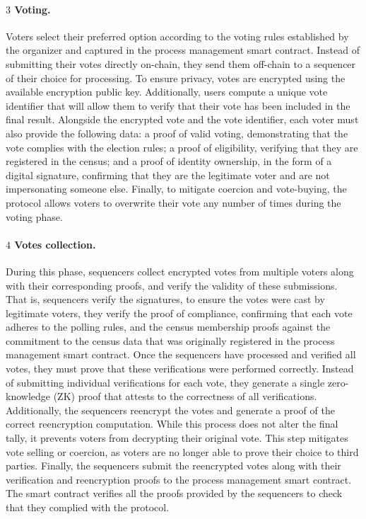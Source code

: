 \paragraph{$\boxed{3}$ Voting.}

Voters select their preferred option according to the voting rules established by the organizer and captured in the process management smart contract. Instead of submitting their votes directly on-chain, they send them off-chain to a sequencer of their choice for processing. To ensure privacy, votes are encrypted using the available encryption public key. 
Additionally, users compute a unique vote identifier that will allow them to verify that their vote has been included in the final result. Alongside the encrypted vote and the vote identifier, each voter must also provide the following data: a proof of valid voting, demonstrating that the vote complies with the election rules; a proof of eligibility, verifying that they are registered in the census; and a proof of identity ownership, in the form of a digital signature, confirming that they are the legitimate voter and are not impersonating someone else. Finally, to mitigate coercion and vote-buying, the protocol allows voters to overwrite their vote any number of times during the voting phase. 

\paragraph{$\boxed{4}$ Votes collection.}

During this phase, sequencers collect encrypted votes from multiple voters along with their corresponding proofs, and verify the validity of these submissions. That is, sequencers
verify the signatures, to ensure the votes were cast by legitimate voters, they verify the proof of compliance, confirming that each vote adheres to the polling rules, and the census membership proofs against the commitment to the census data that was originally registered in the process management smart contract. Once the sequencers have processed and verified all votes, they must prove that these verifications were performed correctly. Instead of submitting individual verifications for each vote, they generate a single zero-knowledge (ZK) proof that attests to the correctness of all verifications.
Additionally, the sequencers reencrypt the votes and generate a proof of the correct reencryption computation. While this process does not alter the final tally, it prevents voters from decrypting their original vote. This step mitigates vote selling or coercion, as voters are no longer able to prove their choice to third parties. Finally, the sequencers submit the reencrypted votes along with their verification and reencryption proofs to the process management smart contract. The smart contract verifies all the proofs provided by the sequencers to check that they complied with the protocol.


